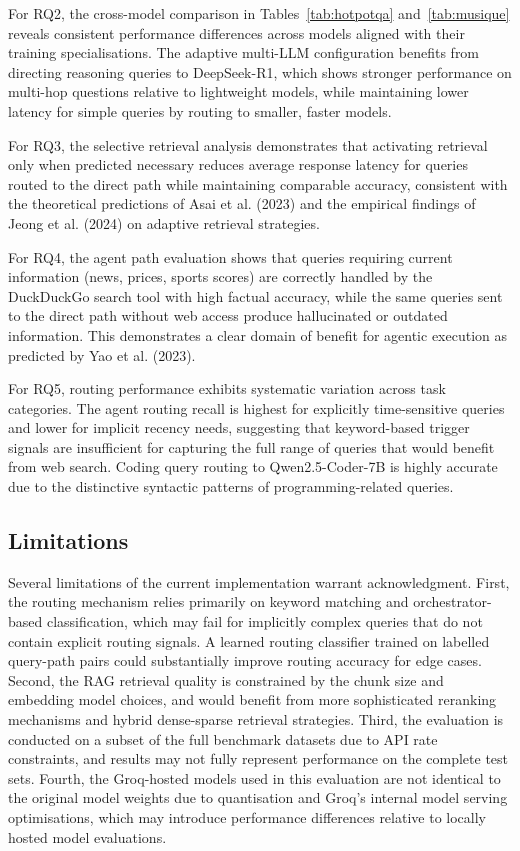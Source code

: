 \documentclass[12pt,a4paper]{article}
\begin{document}
For RQ2, the cross-model comparison in Tables~\ref{tab:hotpotqa} and~\ref{tab:musique} reveals consistent performance differences across models aligned with their training specialisations. The adaptive multi-LLM configuration benefits from directing reasoning queries to DeepSeek-R1, which shows stronger performance on multi-hop questions relative to lightweight models, while maintaining lower latency for simple queries by routing to smaller, faster models.

For RQ3, the selective retrieval analysis demonstrates that activating retrieval only when predicted necessary reduces average response latency for queries routed to the direct path while maintaining comparable accuracy, consistent with the theoretical predictions of Asai et al. (2023) and the empirical findings of Jeong et al. (2024) on adaptive retrieval strategies.

For RQ4, the agent path evaluation shows that queries requiring current information (news, prices, sports scores) are correctly handled by the DuckDuckGo search tool with high factual accuracy, while the same queries sent to the direct path without web access produce hallucinated or outdated information. This demonstrates a clear domain of benefit for agentic execution as predicted by Yao et al. (2023).

For RQ5, routing performance exhibits systematic variation across task categories. The agent routing recall is highest for explicitly time-sensitive queries and lower for implicit recency needs, suggesting that keyword-based trigger signals are insufficient for capturing the full range of queries that would benefit from web search. Coding query routing to Qwen2.5-Coder-7B is highly accurate due to the distinctive syntactic patterns of programming-related queries.

\subsection{Limitations}
\label{subsec:limitations}

Several limitations of the current implementation warrant acknowledgment. First, the routing mechanism relies primarily on keyword matching and orchestrator-based classification, which may fail for implicitly complex queries that do not contain explicit routing signals. A learned routing classifier trained on labelled query-path pairs could substantially improve routing accuracy for edge cases. Second, the RAG retrieval quality is constrained by the chunk size and embedding model choices, and would benefit from more sophisticated reranking mechanisms and hybrid dense-sparse retrieval strategies. Third, the evaluation is conducted on a subset of the full benchmark datasets due to API rate constraints, and results may not fully represent performance on the complete test sets. Fourth, the Groq-hosted models used in this evaluation are not identical to the original model weights due to quantisation and Groq's internal model serving optimisations, which may introduce performance differences relative to locally hosted model evaluations.
\end{document}

